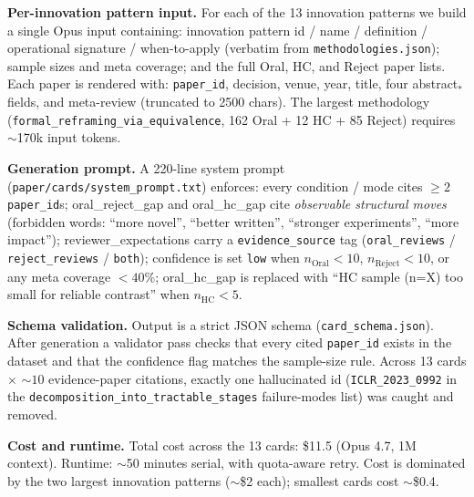 \documentclass[10pt,a4paper]{article}
\begin{document}
\textbf{Per-innovation pattern input.} For each of the 13 innovation patterns we build a single Opus input containing: innovation pattern id / name / definition / operational signature / when-to-apply (verbatim from \texttt{methodologies.json}); sample sizes and meta coverage; and the full Oral, HC, and Reject paper lists. Each paper is rendered with: \texttt{paper\_id}, decision, venue, year, title, four abstract$_*$ fields, and meta-review (truncated to 2500 chars). The largest methodology (\texttt{formal\_reframing\_via\_equivalence}, 162 Oral + 12 HC + 85 Reject) requires $\sim$170k input tokens.

\textbf{Generation prompt.} A 220-line system prompt (\texttt{paper/cards/system\_prompt.txt}) enforces: every condition / mode cites $\geq 2$ \texttt{paper\_id}s; oral\_reject\_gap and oral\_hc\_gap cite \emph{observable structural moves} (forbidden words: ``more novel'', ``better written'', ``stronger experiments'', ``more impact''); reviewer\_expectations carry a \texttt{evidence\_source} tag (\texttt{oral\_reviews} / \texttt{reject\_reviews} / \texttt{both}); confidence is set \texttt{low} when $n_{\text{Oral}}<10$, $n_{\text{Reject}}<10$, or any meta coverage $<40\%$; oral\_hc\_gap is replaced with ``HC sample (n=X) too small for reliable contrast'' when $n_{\text{HC}}<5$.

\textbf{Schema validation.} Output is a strict JSON schema (\texttt{card\_schema.json}). After generation a validator pass checks that every cited \texttt{paper\_id} exists in the dataset and that the confidence flag matches the sample-size rule. Across 13 cards $\times$ ${\sim}10$ evidence-paper citations, exactly one hallucinated id (\texttt{ICLR\_2023\_0992} in the \texttt{decomposition\_into\_tractable\_stages} failure-modes list) was caught and removed.

\textbf{Cost and runtime.} Total cost across the 13 cards: \$11.5 (Opus 4.7, 1M context). Runtime: $\sim$50 minutes serial, with quota-aware retry. Cost is dominated by the two largest innovation patterns ($\sim$\$2 each); smallest cards cost $\sim$\$0.4.
\end{document}
